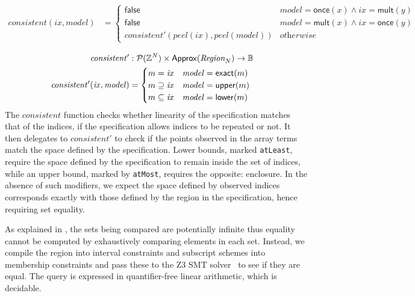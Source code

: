 \begin{align*}
  \mathit{consistent}(\mathit{ix}, \mathit{model}) & = \begin{cases}
    \mathsf{false} & \mathit{model} = \mathsf{once}(x) \wedge ix =
    \mathsf{mult}(y) \\
    \mathsf{false} & \mathit{model} = \mathsf{mult}(x) \wedge ix = \mathsf{once}(y) \\
    \mathit{consistent'}(\mathit{peel}(ix), \mathit{peel}(model)) & \textit{otherwise}
  \end{cases} \\
\end{align*}
\begin{align*}
  \mathit{consistent'} & :
    \mathcal{P}(\bz{}^N) \times
    \mathsf{Approx}(\region{N}) \to \mathbb{B} & \\
%
  \mathit{consistent'}(\mathit{ix}, \mathit{model}) & = \begin{cases}
    m = \mathit{ix} & \mathit{model} = \mathsf{exact}(m) \\
    m \supseteq \mathit{ix} & \mathit{model} = \mathsf{upper}(m) \\
    m \subseteq \mathit{ix} & \mathit{model} = \mathsf{lower}(m)
  \end{cases}
\end{align*}
%
The $\mathit{consistent}$ function checks whether linearity of the
specification matches that of the indices, \ie{} if the specification allows
indices to be repeated or not. It then delegates to $\mathit{consistent'}$
to check if the points observed in the array terms match the space
defined by the specification. Lower bounds, marked \texttt{atLeast},
require the space defined by the specification to remain inside the
set of indices, while an upper bound, marked by \texttt{atMost},
requires the opposite: enclosure. In the absence of such modifiers, we expect
the space defined by observed indices corresponds exactly with those defined by the
region in the specification, hence requiring set equality.

As explained in , the sets being compared are
potentially infinite thus equality cannot be computed by exhaustively
comparing elements in each set. Instead, we compile the region into
interval constraints and subscript schemes into membership constraints and pass
these to the \textsc{Z3} SMT solver~\citep{de2008z3} to see if they are equal. The
query is expressed in quantifier-free linear arithmetic, which is decidable.

